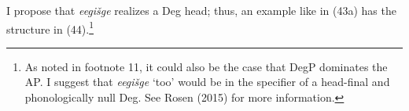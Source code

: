 \documentclass[output=paper]{LSP/langsci}
\begin{document}
\begin{exe}
\ex
\begin{xlist}




\end{xlist}
\end{exe}

I propose that \textit{eegi\v{s}ge} realizes a Deg head; thus, an example like in (43a) has the structure in (44).\footnote{As noted in footnote 11, it could also be the case that DegP dominates the AP. I suggest that \textit{eegi\v{s}ge} `too' would be in the specifier of a head-final and phonologically null Deg. See Rosen (2015) for more information.}

\begin{exe}
\ex 
{\hspace{1em}}\newline
{}
\end{exe}
\end{document}
